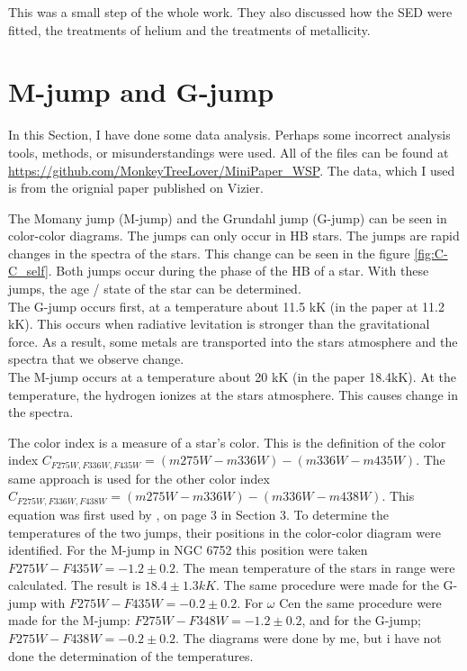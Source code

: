 \documentclass{aa}
\begin{document}
This was a small step of the whole work. They also discussed how the SED were fitted, the treatments of helium and the treatments of metallicity. 


\section{M-jump and G-jump}
\label{sec:4}
In this Section, I have done some data analysis. Perhaps some incorrect analysis tools, methods, or misunderstandings were used. All of the files can be found at \href{https://github.com/MonkeyTreeLover/MiniPaper_WSP}{https://github.com/MonkeyTreeLover/MiniPaper\_WSP}. The data, which I used is from the orignial paper published on Vizier. 

The Momany jump (M-jump) \citep{2002ApJ...576L..65M} and the Grundahl jump (G-jump) \citep{1999ApJ...524..242G} can be seen in color-color diagrams. The jumps can only occur in HB stars. The jumps are rapid changes in the spectra of the stars. This change can be seen in the figure \ref{fig:C-C_self}. Both jumps occur during the phase of the HB of a star. With these jumps, the age / state of the star can be determined. \\
The G-jump occurs first, at a temperature about 11.5 kK (in the paper at 11.2 kK). This occurs when radiative levitation is stronger than the gravitational force. As a result, some metals are transported into the stars atmosphere and the spectra that we observe change.  \\
The M-jump occurs at a temperature about 20 kK (in the paper 18.4kK). At the temperature, the hydrogen ionizes at the stars atmosphere. This causes change in the spectra. 

The color index is a measure of a star's color. This is the definition of the color index $C_{F275W, F336W, F435W} = (m275W-m336W)-(m336W-m435W)$. The same approach is used for the other color index $C_{F275W, F336W, F438W} = (m275W-m336W)-(m336W-m438W)$. This equation was first used by \cite{2013ApJ...767..120M}, on page 3 in Section 3. 
To determine the temperatures of the two jumps, their positions in the color-color diagram were identified. For the M-jump in NGC 6752 this position were taken $F275W-F435W=-1.2 \pm 0.2$. The mean temperature of the stars in range were calculated. The result is $18.4 \pm 1.3 kK$. The same procedure were made for the G-jump with $F275W-F435W=-0.2 \pm 0.2$. For $\omega$ Cen the same procedure were made for the M-jump: $F275W-F348W = -1.2 \pm 0.2$,  and for the G-jump; $F275W-F438W = -0.2 \pm 0.2$. The diagrams were done by me, but i have not done the determination of the temperatures. 
\end{document}
